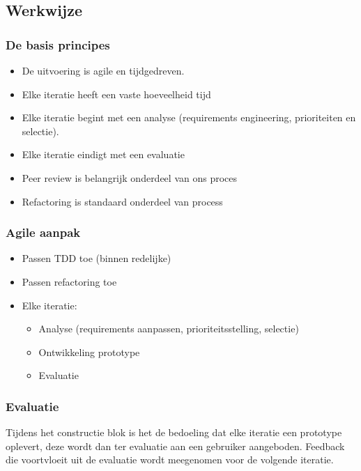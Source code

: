 \subsection{Werkwijze}
\subsubsection{De basis principes}
\begin{itemize}
 \item De uitvoering is agile en tijdgedreven.
 \item Elke iteratie heeft een vaste hoeveelheid tijd
 \item Elke iteratie begint met een analyse (requirements engineering, prioriteiten en selectie).     \item Elke iteratie eindigt met een evaluatie
\item Peer review is belangrijk onderdeel van ons proces
 \item Refactoring is standaard onderdeel van process
\end{itemize}

\subsubsection{Agile aanpak}
\begin{itemize}
 \item Passen TDD toe (binnen redelijke)
 \item Passen refactoring toe
 \item Elke iteratie:
 \begin{itemize}
   \item Analyse (requirements aanpassen, prioriteitsstelling, selectie)
   \item Ontwikkeling prototype
   \item Evaluatie
 \end{itemize}
\end{itemize}

\subsubsection{Evaluatie}
Tijdens het constructie blok is het de bedoeling dat elke iteratie een prototype oplevert, deze wordt dan ter evaluatie aan een gebruiker aangeboden. Feedback die voortvloeit uit de evaluatie wordt meegenomen voor de volgende iteratie.




